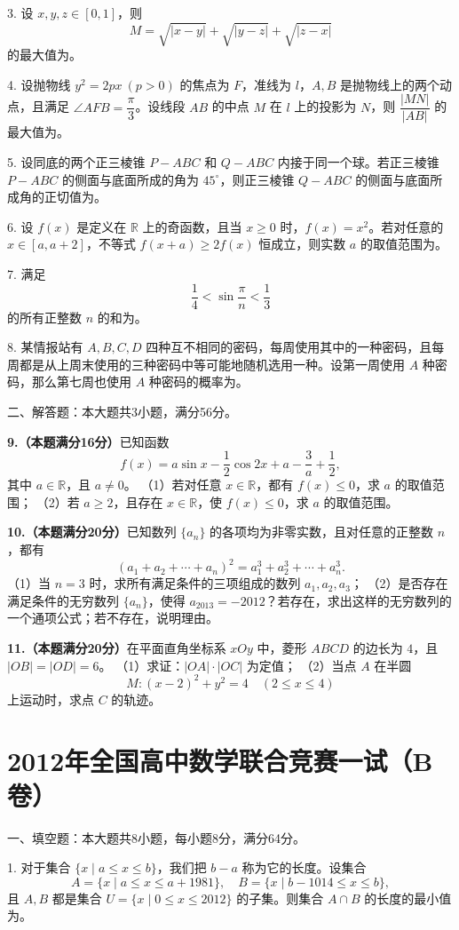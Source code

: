 \documentclass[11pt]{ctexart}
\begin{document}
3. 设 $x,y,z\in[0,1]$，则
$$
M=\sqrt{|x-y|}+\sqrt{|y-z|}+\sqrt{|z-x|}
$$
的最大值为\blank{}。

4. 设抛物线 $y^2=2px\ (p>0)$ 的焦点为 $F$，准线为 $l$，$A,B$ 是抛物线上的两个动点，且满足 $\angle AFB=\dfrac\pi3$。设线段 $AB$ 的中点 $M$ 在 $l$ 上的投影为 $N$，则 $\dfrac{|MN|}{|AB|}$ 的最大值为\blank{}。

5. 设同底的两个正三棱锥 $P-ABC$ 和 $Q-ABC$ 内接于同一个球。若正三棱锥 $P-ABC$ 的侧面与底面所成的角为 $45^\circ$，则正三棱锥 $Q-ABC$ 的侧面与底面所成角的正切值为\blank{}。

6. 设 $f(x)$ 是定义在 $\mathbb R$ 上的奇函数，且当 $x\ge0$ 时，$f(x)=x^2$。若对任意的 $x\in[a,a+2]$，不等式 $f(x+a)\ge2f(x)$ 恒成立，则实数 $a$ 的取值范围为\blank{}。

7. 满足
$$
\frac14<\sin\frac\pi n<\frac13
$$
的所有正整数 $n$ 的和为\blank{}。

8. 某情报站有 $A,B,C,D$ 四种互不相同的密码，每周使用其中的一种密码，且每周都是从上周末使用的三种密码中等可能地随机选用一种。设第一周使用 $A$ 种密码，那么第七周也使用 $A$ 种密码的概率为\blank{}。

二、解答题：本大题共3小题，满分56分。


\clearpage
\textbf{9.（本题满分16分）}已知函数
$$
f(x)=a\sin x-\frac12\cos2x+a-\frac3a+\frac12,
$$
其中 $a\in\mathbb R$，且 $a\ne0$。  
（1）若对任意 $x\in\mathbb R$，都有 $f(x)\le0$，求 $a$ 的取值范围；  
（2）若 $a\ge2$，且存在 $x\in\mathbb R$，使 $f(x)\le0$，求 $a$ 的取值范围。

\clearpage
\textbf{10.（本题满分20分）}已知数列 $\{a_n\}$ 的各项均为非零实数，且对任意的正整数 $n$，都有
$$
(a_1+a_2+\cdots+a_n)^2=a_1^3+a_2^3+\cdots+a_n^3.
$$
（1）当 $n=3$ 时，求所有满足条件的三项组成的数列 $a_1,a_2,a_3$；  
（2）是否存在满足条件的无穷数列 $\{a_n\}$，使得 $a_{2013}=-2012$？若存在，求出这样的无穷数列的一个通项公式；若不存在，说明理由。

\clearpage
\textbf{11.（本题满分20分）}在平面直角坐标系 $xOy$ 中，菱形 $ABCD$ 的边长为 $4$，且 $|OB|=|OD|=6$。  
（1）求证：$|OA|\cdot|OC|$ 为定值；  
（2）当点 $A$ 在半圆
$$
M:(x-2)^2+y^2=4\quad(2\le x\le4)
$$
上运动时，求点 $C$ 的轨迹。

\clearpage
\section*{2012年全国高中数学联合竞赛一试（B卷）}

一、填空题：本大题共8小题，每小题8分，满分64分。

1. 对于集合 $\{x\mid a\le x\le b\}$，我们把 $b-a$ 称为它的长度。设集合
$$
A=\{x\mid a\le x\le a+1981\},\quad B=\{x\mid b-1014\le x\le b\},
$$
且 $A,B$ 都是集合 $U=\{x\mid0\le x\le2012\}$ 的子集。则集合 $A\cap B$ 的长度的最小值为\blank{}。
\end{document}
